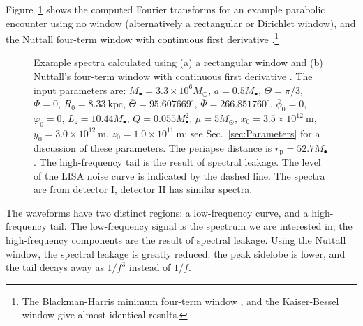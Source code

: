 \documentclass[useAMS,usedcolumn,usegraphicx,usenatbib]{mn2e}
\newcommand{\Figref}[1]{Figure~\ref{fig:#1}}
\newcommand{\secref}[1]{Sec.~\ref{sec:#1}}
\newcommand{\units}[1]{\ensuremath{~\mathrm{#1}}}
\newcommand{\sub}[1]{\ensuremath{_\mathrm{#1}}}
\begin{document}
\Figref{Windowing} shows the computed Fourier transforms for an example parabolic encounter using no window (alternatively a rectangular or Dirichlet window), and the Nuttall four-term window with continuous first derivative \citep{Nuttall1981}.\footnote{The Blackman-Harris minimum four-term window \citep{Harris1978, Nuttall1981}, and the Kaiser-Bessel window \citep{Harris1978, Kaiser1980} give almost identical results.}
\begin{figure}[htbp]
  \begin{center}
    \caption{Example spectra calculated using (a) a rectangular window and (b) Nuttall's four-term window with continuous first derivative \citep{Nuttall1981}. The input parameters are: $M_\bullet =3.3 \times 10^6 M_\odot$, $a = 0.5 M_\bullet$, $\Theta = \pi/3$, $\Phi = 0$, $R_0 = 8.33\units{kpc}$, $\overline{\Theta} = {95.607669}^{\circ}$, $\overline{\Phi} = {266.851760}^{\circ}$, $\overline{\phi}_0 = 0$, $\varphi_0 = 0$, $L_z = 10.44 M_\bullet$, $Q = 0.055 M_\bullet^2$, $\mu = 5 M_\odot$, $x_0 = 3.5 \times 10^{12}\units{m}$, $y_0 = 3.0 \times 10^{12}\units{m}$, $z_0 = 1.0 \times 10^{11}\units{m}$; see \secref{Parameters} for a discussion of these parameters. The periapse distance is $r\sub{p} = 52.7 M_\bullet$. The high-frequency tail is the result of spectral leakage. The level of the LISA noise curve is indicated by the dashed line. The spectra are from detector I, detector II has similar spectra.}
    \label{fig:Windowing}
  \end{center}
\end{figure}
The waveforms have two distinct regions: a low-frequency curve, and a high-frequency tail. The low-frequency signal is the spectrum we are interested in; the high-frequency components are the result of spectral leakage. Using the Nuttall window, the spectral leakage is greatly reduced; the peak sidelobe is lower, and the tail decays away as $1/{f^3}$ instead of $1/{f}$.
\end{document}
